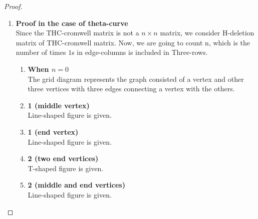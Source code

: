 \documentclass{article}
\theoremstyle{definition}
\theoremstyle{theorem}
\theoremstyle{proposition}
\theoremstyle{corollary}
\begin{document}
\begin{proof}
\begin{enumerate}
\item \textbf{Proof in the case of theta-curve}\\
Since the THC-cromwell matrix is not a $n\times n$ matrix, we consider H-deletion matrix of THC-cromwell matrix. 
Now, we are going to count n, which is the number of times $1$s in edge-columns is included in Three-rows.
\begin{enumerate}
    \item \textbf{When $n = 0$}\\
    The grid diagram represents the graph consisted of a vertex and other three vertices with three edges connecting a vertex with the others.
    \item \textbf{1 (middle vertex)}\\
    Line-shaped figure is given.
    \item \textbf{1 (end vertex)}\\
    Line-shaped figure is given.
    \item \textbf{2 (two end vertices)}\\
    T-shaped figure is given.
    \item \textbf{2 (middle and end vertices)}\\
    Line-shaped figure is given.
\end{enumerate}


\end{enumerate}
\end{proof}
\end{document}
